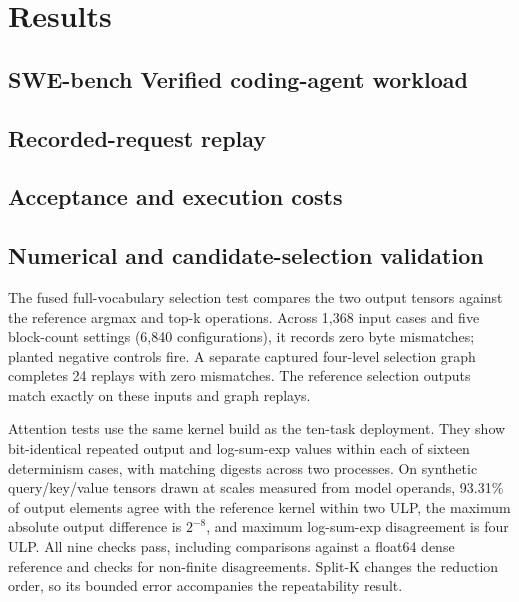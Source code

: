 \documentclass[conference]{IEEEtran}
\begin{document}


\section{Results}
\label{sec:results}
\subsection{SWE-bench Verified coding-agent workload}
\label{sec:agent-workload}


\subsection{Recorded-request replay}
\label{sec:request-replay}


\subsection{Acceptance and execution costs}


\subsection{Numerical and candidate-selection validation}
\label{sec:current-validation}


The fused full-vocabulary selection test compares the two output tensors against the reference argmax and top-k operations. Across 1,368 input cases and five block-count settings (6,840 configurations), it records zero byte mismatches; planted negative controls fire. A separate captured four-level selection graph completes 24 replays with zero mismatches. The reference selection outputs match exactly on these inputs and graph replays.

Attention tests use the same kernel build as the ten-task deployment. They show bit-identical repeated output and log-sum-exp values within each of sixteen determinism cases, with matching digests across two processes. On synthetic query/key/value tensors drawn at scales measured from model operands, 93.31\% of output elements agree with the reference kernel within two ULP, the maximum absolute output difference is $2^{-8}$, and maximum log-sum-exp disagreement is four ULP. All nine checks pass, including comparisons against a float64 dense reference and checks for non-finite disagreements. Split-K changes the reduction order, so its bounded error accompanies the repeatability result.
\end{document}
